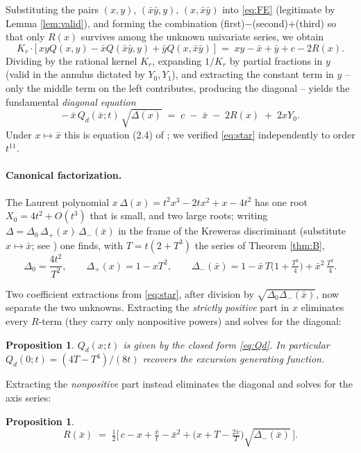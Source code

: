 \documentclass[11pt]{article}
\newtheorem{proposition}[theorem]{Proposition}
\newcommand{\bx}{\bar x}\newcommand{\by}{\bar y}
\begin{document}
Substituting the pairs $(x,y)$, $(\bx\by,y)$, $(x,\bx\by)$ into \eqref{eq:FE} (legitimate by Lemma \ref{lem:valid}), and forming the combination (first)$-$(second)$+$(third) so that only $R(x)$ survives among the unknown univariate series, we obtain
\[ K_r\cdot\big[\,xyQ(x,y) - \bx Q(\bx\by,y) + \by Q(x,\bx\by)\,\big] \;=\; xy - \bx + \by + c - 2R(x). \]
Dividing by the rational kernel $K_r$, expanding $1/K_r$ by partial fractions in $y$ (valid in the annulus dictated by $Y_0,Y_1$), and extracting the constant term in $y$ -- only the middle term on the left contributes, producing the diagonal -- yields the fundamental \emph{diagonal equation}
\begin{equation}\label{eq:star}
-\,\bx\,Q_d(\bx;t)\,\sqrt{\Delta(x)} \;=\; c \;-\; \bx \;-\; 2R(x) \;+\; 2xY_0 .
\end{equation}
Under $x\mapsto\bx$ this is equation (2.4) of \cite{Mishna}; we verified \eqref{eq:star} independently to order $t^{11}$.

\paragraph{Canonical factorization.} The Laurent polynomial $x\,\Delta(x) = t^2x^3-2tx^2+x-4t^2$ has one root $X_0 = 4t^2+O(t^3)$ that is small, and two large roots; writing $\Delta = \Delta_0\,\Delta_+(x)\,\Delta_-(\bx)$ in the frame of the Kreweras discriminant (substitute $x\mapsto \bx$; see \cite[\S2.2]{BM05}) one finds, with $T = t(2+T^3)$ the series of Theorem \ref{thm:B},
\[ \Delta_0 = \frac{4t^2}{T^2},\qquad \Delta_+(x) = 1-xT^2,\qquad \Delta_-(\bx) = 1 - \bx\,T\big(1+\tfrac{T^3}{4}\big) + \bx^2\,\tfrac{T^2}{4}. \]

Two coefficient extractions from \eqref{eq:star}, after division by $\sqrt{\Delta_0\Delta_-(\bx)}$, now separate the two unknowns. Extracting the \emph{strictly positive} part in $x$ eliminates every $R$-term (they carry only nonpositive powers) and solves for the diagonal:

\begin{proposition}\label{prop:Qd}
$Q_d(x;t)$ is given by the closed form \eqref{eq:Qd}. In particular $Q_d(0;t) = (4T-T^4)/(8t)$ recovers the excursion generating function.
\end{proposition}

Extracting the \emph{nonpositive} part instead eliminates the diagonal and solves for the axis series:

\begin{proposition}\label{prop:R}
\[ R(\bx) \;=\; \tfrac12\Big[\,c - x + \tfrac{\bx}{t} - \bx^{2} + \big(x + T - \tfrac{2\bx}{T}\big)\sqrt{\Delta_-(\bx)}\,\Big]. \]
\end{proposition}
\end{document}
